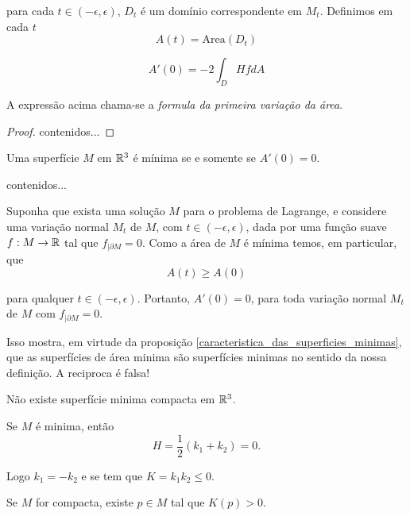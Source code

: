 para cada $t \in (-\epsilon,\epsilon)$, $D_t$ é um domínio correspondente em $M_t$. Definimos em cada $t$
\begin{equation*}
	A(t) = \text{Area}(D_t)
\end{equation*}

\begin{teorema}
	\begin{equation*}
		A'(0) = -2 \int_D Hf dA
	\end{equation*}
\end{teorema}

A expressão acima chama-se a \emph{formula da primeira variação da área}.

\begin{proof}
	contenidos...
\end{proof}

\begin{proposicao}\label{caracteristica_das_superficies_minimas}
	Uma superfície $M$ em $\mathbb{R}^3$ é mínima se e somente se $A'(0) = 0$.
\end{proposicao}

\begin{demonstracao}
	contenidos...
\end{demonstracao}

\begin{observacao}
	Suponha que exista uma solução $M$ para o problema de Lagrange, e considere uma variação normal $M_t$ de $M$, com $t \in (-\epsilon,\epsilon)$, dada por uma função suave $f: M \rightarrow \mathbb{R}$ tal que $f_{|\partial M} = 0$. Como a área de $M$ é mínima temos, em particular, que
	\begin{equation*}
		A(t) \geq A(0)
	\end{equation*}
	
	para qualquer $t \in (-\epsilon,\epsilon)$. Portanto, $A'(0)=0$, para toda variação normal $M_t$ de $M$ com $f_{|\partial M}=0$.
	
	Isso mostra, em virtude da proposição \ref{caracteristica_das_superficies_minimas}, que as superfícies de área minima são superfícies minimas no sentido da nossa definição. A reciproca é falsa!
\end{observacao}

\begin{proposicao}
	Não existe superfície minima compacta em $\mathbb{R}^3$.
\end{proposicao}

\begin{demonstracao}
	Se $M$ é minima, então
	\begin{equation*}
		H = \frac{1}{2} (k_1 + k_2) = 0.
	\end{equation*}
	
	Logo $k_1 = -k_2$ e se tem que $K = k_1 k_2 \leq 0$.
	
	Se $M$ for compacta, existe $p \in M$ tal que $K(p) > 0$.
\end{demonstracao}

